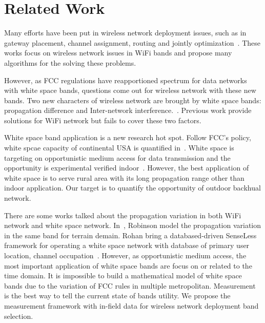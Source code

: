 \section{Related Work}
\label{sec:related}

Many efforts have been put in wireless network deployment issues, such as in gateway placement,
 channel assignment, routing and jointly optimization~\cite{he2008optimizing,ramachandran2006interference,akyildiz2006next}.
 These works focus on wireless network issues in WiFi bands and propose many algorithms 
 for the solving these problems.

However, as FCC regulations have reapportioned spectrum for data networks with white space bands, 
questions come out for wireless network with these new bands. Two new characters of wireless network
 are brought by white space bands: propagation difference and Inter-network interference.~\cite{cui2013leveraging,bahl2009white}.
 Previous work provide solutions for WiFi network but fails to cover these two factors.
 
 White space band application is a new research hot spot. Follow FCC's policy, white spcae capacity 
 of  continental USA is quantified in~\cite{harrison2010much}. White space is targeting on opportunistic 
  medium access for data transmission and the opportunity is experimental verified indoor~\cite{obregon2010experimental}.
  However, the best application of white space is to serve rural area with its long propagation range
   other than indoor application. Our target is to quantify the opportunity of outdoor backhual network.

There are some works talked about the propagation variation in both WiFi network and white space network.
In~\cite{robinson2010deploying}, Robinson model the propagation variation in the same band for terrain 
demain. Rohan bring a databased-driven SenseLess framework for operating a white space network with 
database of primary user location, channel occupation~\cite{murty2012senseless}. 
However, as opportunistic medium access, the most important application of white space bands are 
focus on or related to the time domain. It is impossible to build a mathematical model of white 
space bands due to the variation of FCC rules 
in multiple metropolitan. Measurement is the best way to tell the current state of bands utility.
We propose the measurement framework with in-field data for wireless network deployment band selection.


 


